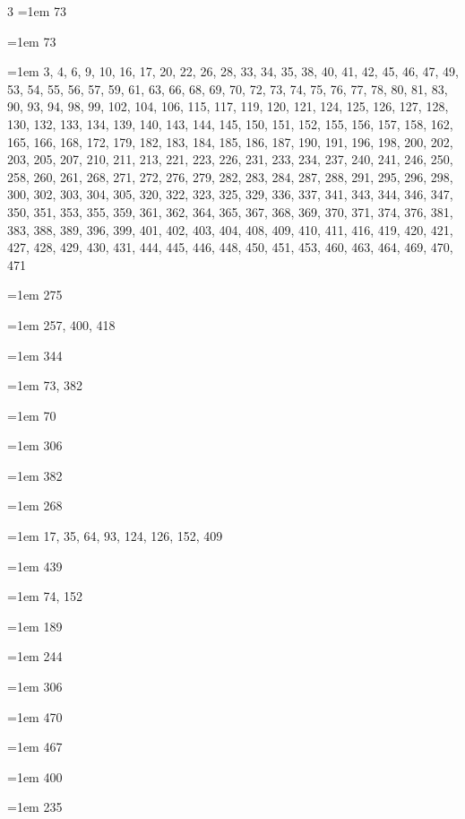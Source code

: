 \begin{multicols}{3}
\hangindent=1em  73\par
\hangindent=1em  73\par
\hangindent=1em  3, 4, 6, 9, 10, 16, 17, 20, 22, 26, 28, 33, 34, 35, 38, 40, 41, 42, 45, 46, 47, 49, 53, 54, 55, 56, 57, 59, 61, 63, 66, 68, 69, 70, 72, 73, 74, 75, 76, 77, 78, 80, 81, 83, 90, 93, 94, 98, 99, 102, 104, 106, 115, 117, 119, 120, 121, 124, 125, 126, 127, 128, 130, 132, 133, 134, 139, 140, 143, 144, 145, 150, 151, 152, 155, 156, 157, 158, 162, 165, 166, 168, 172, 179, 182, 183, 184, 185, 186, 187, 190, 191, 196, 198, 200, 202, 203, 205, 207, 210, 211, 213, 221, 223, 226, 231, 233, 234, 237, 240, 241, 246, 250, 258, 260, 261, 268, 271, 272, 276, 279, 282, 283, 284, 287, 288, 291, 295, 296, 298, 300, 302, 303, 304, 305, 320, 322, 323, 325, 329, 336, 337, 341, 343, 344, 346, 347, 350, 351, 353, 355, 359, 361, 362, 364, 365, 367, 368, 369, 370, 371, 374, 376, 381, 383, 388, 389, 396, 399, 401, 402, 403, 404, 408, 409, 410, 411, 416, 419, 420, 421, 427, 428, 429, 430, 431, 444, 445, 446, 448, 450, 451, 453, 460, 463, 464, 469, 470, 471\par
\hangindent=1em  275\par
\hangindent=1em  257, 400, 418\par
\hangindent=1em  344\par
\hangindent=1em  73, 382\par
\hangindent=1em  70\par
\hangindent=1em  306\par
\hangindent=1em  382\par
\hangindent=1em  268\par
\hangindent=1em  17, 35, 64, 93, 124, 126, 152, 409\par
\hangindent=1em  439\par
\hangindent=1em  74, 152\par
\hangindent=1em  189\par
\hangindent=1em  244\par
\hangindent=1em  306\par
\hangindent=1em  470\par
\hangindent=1em  467\par
\hangindent=1em  400\par
\hangindent=1em  235\par

\end{multicols}
